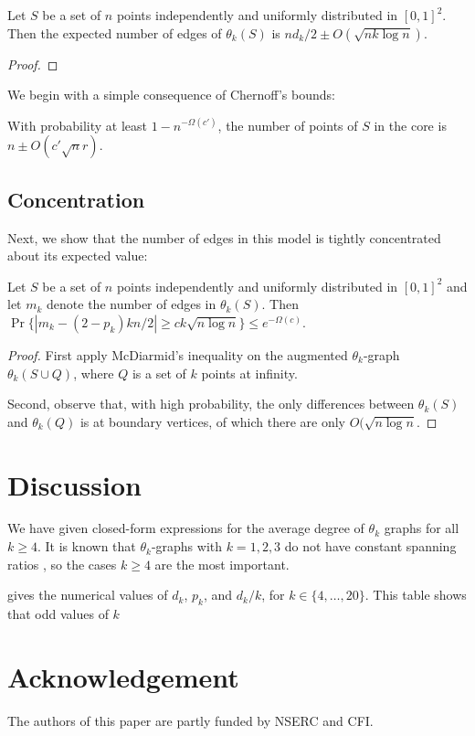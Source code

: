 \documentclass{patmorin}
\begin{document}
\begin{lem}
 Let $S$ be a set of $n$ points independently and uniformly distributed
 in $[0,1]^2$.  Then the expected number of edges of $\theta_k(S)$ is 
 $nd_k/2\pm O(\sqrt{nk\log n})$.
\end{lem}

\begin{proof}

\end{proof}


We begin with a simple consequence of
Chernoff's bounds:

\begin{lem}
  With probability at least $1-n^{-\Omega(c')}$, the number of points
  of $S$ in the core is $n\pm O(c'\sqrt{n}r)$.
\end{lem}

\subsection{Concentration}

Next, we show that the number of edges in this model is tightly concentrated about its expected value:

\begin{lem}
 Let $S$ be a set of $n$ points independently and uniformly distributed
 in $[0,1]^2$ and let $m_k$ denote the number of edges in $\theta_k(S)$.
 Then $\Pr\{|m_k-(2-p_k)kn/2| \ge ck\sqrt{n\log n}\} \le e^{-\Omega(c)}$.
\end{lem}

\begin{proof}
First apply McDiarmid's inequality on the augmented $\theta_k$-graph
$\theta_k(S\cup Q)$, where $Q$ is a set of $k$ points at infinity.

Second, observe that, with high probability, the only differences between
$\theta_k(S)$ and $\theta_k(Q)$ is at boundary vertices, of which there
are only $O(\sqrt{n\log n}$.
\end{proof}





\section{Discussion}

We have given closed-form expressions for the average degree of $\theta_k$
graphs for all $k\ge 4$.  It is known that $\theta_k$-graphs with
$k=1,2,3$ do not have constant spanning ratios \cite{S}, so the cases
$k\ge 4$ are the most important.

 gives the numerical values of $d_k$, $p_k$, and $d_k/k$,
for $k\in\{4,\ldots,20\}$.  This table shows that odd values of $k$

\section*{Acknowledgement}

The authors of this paper are partly funded by NSERC and CFI.



\end{document}
